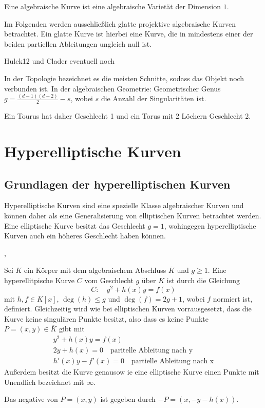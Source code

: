 \begin{definition}
  Eine algebraische Kurve ist eine algebraische Varietät der Dimension $1$.
\end{definition}
\cite[S.137]{Hulek12}

\begin{remark}
  Im Folgenden werden ausschließlich glatte projektive algebraische Kurven betrachtet. Ein glatte Kurve ist hierbei eine Kurve, die in mindestens einer der beiden partiellen Ableitungen ungleich null ist.
\end{remark}
\cite{S.82}{Hulek12} und Clader eventuell noch


\begin{definition}
  In der Topologie bezeichnet es die meisten Schnitte, sodass das Objekt noch verbunden ist.
  In der algebraischen Geometrie: Geometrischer Genus \(g=\frac{(d-1)(d-2)}{2}-s\), wobei $s$ die Anzahl der Singularitäten ist.
\end{definition}
Ein Tourus hat daher Geschlecht 1 und ein Torus mit 2 Löchern Geschlecht 2.
\section{Hyperelliptische Kurven}

\subsection{Grundlagen der hyperelliptischen Kurven}
Hyperelliptische Kurven sind eine spezielle Klasse algebraischer Kurven und können daher als eine Generalisierung von elliptischen Kurven betrachtet werden. Eine elliptische Kurve besitzt das Geschlecht $g=1$, wohingegen hyperelliptische Kurven auch ein höheres Geschlecht haben können.

\cite[2--4]{Menezes96}
\cite[S.304]{Cohen06},\cite[407--408]{Washington08}
\begin{definition}
  Sei $K$ ein Körper mit dem algebraischem Abschluss $\overline{K}$ und $g\geq 1$. Eine hyperellitpische Kurve $C$ vom Geschlecht $g$ über $K$ ist durch die Gleichung
  \[
    C:\quad y^2+h(x)y=f(x)
  \]
  mit $h,f\in K[x]$, $\deg(h)\leq g$  und $\deg(f)=2g+1$, wobei $f$ normiert ist, definiert. Gleichzeitig wird wie bei elliptischen Kurven vorrausgesetzt, dass die Kurve keine singulären Punkte besitzt, also dass es keine Punkte $P=(x,y)\in\overline{K}$ gibt mit
  \begin{align*}
    y^2+h(x)y=f(x)                                    \\
    2y+h(x)=0 \quad \text{paritelle Ableitung nach y} \\
    h'(x)y-f'(x)=0 \quad \text{partielle Ableitung nach x}
  \end{align*}
  Außerdem besitzt die Kurve genausow ie eine elliptische Kurve einen Punkte mit Unendlich bezeichnet mit $\infty$.
\end{definition}
Das negative von $P=(x,y)$ ist gegeben durch $-P=(x,-y-h(x))$.

